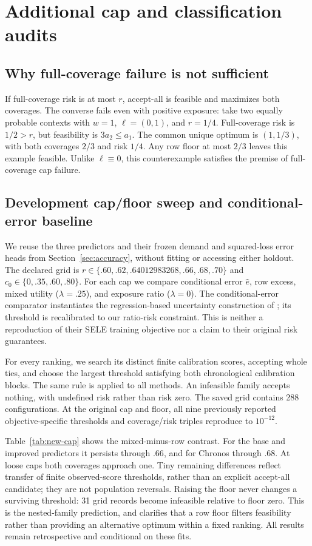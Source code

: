 \section{Additional cap and classification audits}\label{app:new-audits}
\subsection{Why full-coverage failure is not sufficient}\label{app:necessity}
If full-coverage risk is at most $r$, accept-all is feasible and maximizes both coverages. The converse fails even with positive exposure: take two equally probable contexts with $w=1$, $\ell=(0,1)$, and $r=1/4$. Full-coverage risk is $1/2>r$, but feasibility is $3a_2\leq a_1$. The common unique optimum is $(1,1/3)$, with both coverages $2/3$ and risk $1/4$. Any row floor at most $2/3$ leaves this example feasible. Unlike $\ell\equiv0$, this counterexample satisfies the premise of full-coverage cap failure.

\subsection{Development cap/floor sweep and conditional-error baseline}
We reuse the three predictors and their frozen demand and squared-loss error heads from Section~\ref{sec:accuracy}, without fitting or accessing either holdout. The declared grid is $r\in\{.60,.62,.64012983268,.66,.68,.70\}$ and $c_0\in\{0,.35,.60,.80\}$. For each cap we compare conditional error $\hat e$, row excess, mixed utility ($\lambda=.25$), and exposure ratio ($\lambda=0$). The conditional-error comparator instantiates the regression-based uncertainty construction of \citet{franc2023reject}; its threshold is recalibrated to our ratio-risk constraint. This is neither a reproduction of their SELE training objective nor a claim to their original risk guarantees.

For every ranking, we search its distinct finite calibration scores, accepting whole ties, and choose the largest threshold satisfying both chronological calibration blocks. The same rule is applied to all methods. An infeasible family accepts nothing, with undefined risk rather than risk zero. The saved grid contains 288 configurations. At the original cap and floor, all nine previously reported objective-specific thresholds and coverage/risk triples reproduce to $10^{-12}$.

Table~\ref{tab:new-cap} shows the mixed-minus-row contrast. For the base and improved predictors it persists through $.66$, and for Chronos through $.68$. At loose caps both coverages approach one. Tiny remaining differences reflect transfer of finite observed-score thresholds, rather than an explicit accept-all candidate; they are not population reversals. Raising the floor never changes a surviving threshold: 31 grid records become infeasible relative to floor zero. This is the nested-family prediction, and clarifies that a row floor filters feasibility rather than providing an alternative optimum within a fixed ranking. All results remain retrospective and conditional on these fits.

